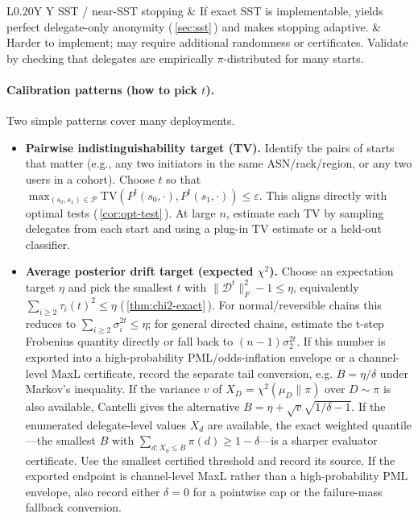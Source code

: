 \documentclass[11pt]{article}
\newcommand{\TV}{\mathrm{TV}}
\newcommand{\cD}{\mathcal{D}}
\begin{document}
\begin{table}[h]
\begin{tabularx}{\linewidth}{L{0.20\linewidth}Y Y}
SST / near-SST stopping &
If exact SST is implementable, yields perfect delegate-only anonymity (\,\cref{sec:sst}\,) and makes stopping adaptive. &
Harder to implement; may require additional randomness or certificates. Validate by checking that delegates are empirically $\pi$-distributed for many starts. \\
\bottomrule
\end{tabularx}
\caption{Protocol knobs and what the mathematics predicts they do.}
\label{tab:knobs}
\end{table}

\paragraph{Calibration patterns (how to pick $t$).}
Two simple patterns cover many deployments.
\begin{itemize}[leftmargin=1.2em]
\item \textbf{Pairwise indistinguishability target (TV).} Identify the pairs of starts that matter
(e.g., any two initiators in the same ASN/rack/region, or any two users in a cohort). Choose $t$ so that
$\max_{(s_0,s_1)\in\mathcal{P}} \TV(P^t(s_0,\cdot),P^t(s_1,\cdot)) \le \varepsilon$.
This aligns directly with optimal tests (\,\cref{cor:opt-test}\,). At large $n$, estimate each TV
by sampling delegates from each start and using a plug-in TV estimate or a held-out classifier.
\item \textbf{Average posterior drift target (expected $\chi^2$).} Choose an expectation target $\eta$ and pick the smallest $t$ with
$\|\cD^t\|_F^2-1\le\eta$, equivalently $\sum_{i\ge2}\tau_i(t)^2\le\eta$
(\,\cref{thm:chi2-exact}\,). For normal/reversible chains this reduces to
$\sum_{i\ge2}\sigma_i^{2t}\le\eta$; for general directed chains, estimate the
t-step Frobenius quantity directly or fall back to $(n-1)\sigma_2^{2t}$. If this
number is exported into a high-probability PML/odds-inflation envelope or a
channel-level MaxL certificate, record the separate tail conversion, e.g.
$B=\eta/\delta$ under Markov's inequality.  If the variance
$v$ of $X_D=\chi^2(\mu_D\|\pi)$ over $D\sim\pi$ is also available, Cantelli gives
the alternative $B=\eta+\sqrt{v}\sqrt{1/\delta-1}$.  If the enumerated
delegate-level values $X_d$ are available, the exact weighted quantile---the
smallest $B$ with $\sum_{d:X_d\le B}\pi(d)\ge 1-\delta$---is a sharper
evaluator certificate.  Use the smallest certified threshold and record its
source.  If the exported endpoint is channel-level MaxL rather than a
high-probability PML envelope, also record either \(\delta=0\) for a pointwise
cap or the failure-mass fallback conversion.
\end{itemize}
\end{document}
